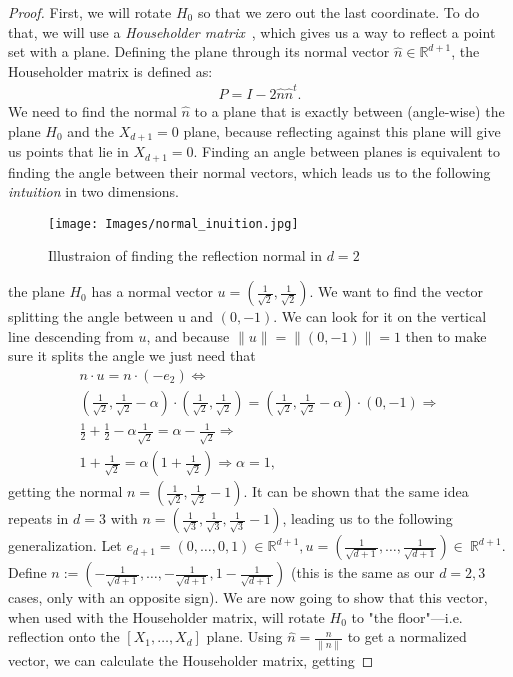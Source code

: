 \begin{proof}
    
    First, we will rotate $H_0$ so that we zero out the last coordinate. To do that, we will use a \emph{Householder matrix}~\cite{householder1958unitary}, which gives us a way to reflect a point set with a plane. Defining the plane through its normal vector $\hat{n}\in \mathbb{R}^{d+1}$, the Householder matrix is defined as:
    \begin{align}\label{eq:reflection}
        P=I-2\hat{n}\hat{n}^t.
    \end{align}
    We need to find the normal $\hat{n}$ to a plane that is exactly between (angle-wise) the plane $H_0$ and the $X_{d+1}=0$ plane, because reflecting against this plane will give us points that lie in $X_{d+1}=0$. 
     Finding an angle between planes is equivalent to finding the angle between their normal vectors, which leads us to the following \emph{intuition} in two dimensions.
     \begin{figure}[H]
        \centering
        \texttt{[image: Images/normal\_inuition.jpg]}
        \caption{Illustraion of finding the reflection normal in $d=2$}
        \label{fig:reflection}
    \end{figure}
     the plane $H_0$ has a normal vector $u=\left(\frac{1}{\sqrt{2}},\frac{1}{\sqrt{2}}\right)$. We want to find the vector splitting the angle between u and $(0,-1)$. We can look for it on the vertical line descending from $u$, and because $\|u\|=\|(0,-1)\|=1$ then to make sure it splits the angle we just need that 
     \begin{align*}
         n\cdot u = n\cdot (-e_2) \iff \\
         \left(\frac{1}{\sqrt{2}},\frac{1}{\sqrt{2}}-\alpha\right)\cdot\left(\frac{1}{\sqrt{2}},\frac{1}{\sqrt{2}}\right)=\left(\frac{1}{\sqrt{2}},\frac{1}{\sqrt{2}}-\alpha\right)\cdot(0,-1) \Rightarrow \\
         \frac{1}{2}+\frac{1}{2}-\alpha\frac{1}{\sqrt{2}}=\alpha-\frac{1}{\sqrt{2}} \Rightarrow \\
         1+\frac{1}{\sqrt{2}}=\alpha(1+\frac{1}{\sqrt{2}})\Rightarrow\alpha=1,
     \end{align*}
    getting the normal $n=\left(\frac{1}{\sqrt{2}},\frac{1}{\sqrt{2}}-1\right)$. It can be shown that the same idea repeats in $d=3$ with $n=\left(\frac{1}{\sqrt{3}},\frac{1}{\sqrt{3}},\frac{1}{\sqrt{3}}-1\right)$, leading us to the following generalization.
    Let $e_{d+1}=\left(0,\dots,0,1\right)\in\mathbb{R}^{d+1},u=\left(\frac{1}{\sqrt{d+1}},\dots,\frac{1}{\sqrt{d+1}}\right)\in~\mathbb{R}^{d+1}$. Define $n:=\left(-\frac{1}{\sqrt{d+1}},\dots,-\frac{1}{\sqrt{d+1}},1-\frac{1}{\sqrt{d+1}}\right)$ (this is the same as our $d=2,3$ cases, only with an opposite sign). We are now going to show that this vector, when used with the Householder matrix, will rotate $H_0$ to "the floor"---i.e. reflection onto the $[X_1,\dots,X_d]$ plane. Using $\hat{n}=\frac{n}{\|n\|}$ to get a normalized vector, we can calculate the Householder matrix, getting

\end{proof}
